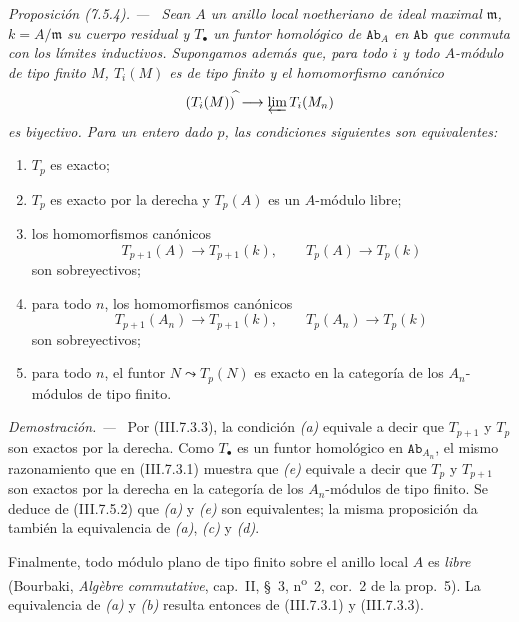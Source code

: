 \documentclass[10pt,oneside]{book}
\newcommand{\cat}[1]{\mathtt{#1}}
\newcommand{\sref}[2][]{\textup{(#2)}}
\newenvironment{proposition}[1][]{\par\medskip\noindent\itshape Proposición (#1). ---\ }{\par}
\newenvironment{proof}{\par\medskip\noindent\textit{Demostración. ---\ }}{\par}
\begin{document}
\begin{proposition}[7.5.4]
\label{III.7.5.4}
Sean $A$ un anillo local noetheriano de ideal maximal $\mathfrak m$,
$k=A/\mathfrak m$ su cuerpo residual y $T_\bullet$ un funtor
homológico de $\cat{Ab}_A$ en $\cat{Ab}$ que conmuta con los límites
inductivos. Supongamos además que, para todo $i$ y todo $A$-módulo
de tipo finito $M$, $T_i(M)$ es de tipo finito y el homomorfismo
canónico
\[
  (T_i(M))^{\widehat{\,}}
  \longrightarrow
  \varprojlim T_i(M_n)
\]
es biyectivo. Para un entero dado $p$, las condiciones siguientes
son equivalentes:
\begin{enumerate}
  \item[(a)] $T_p$ es exacto;
  \item[(b)] $T_p$ es exacto por la derecha y $T_p(A)$ es un
    $A$-módulo libre;
  \item[(c)] los homomorfismos canónicos
    \[
      T_{p+1}(A)\longrightarrow T_{p+1}(k),
      \qquad
      T_p(A)\longrightarrow T_p(k)
    \]
    son sobreyectivos;
  \item[(d)] para todo $n$, los homomorfismos canónicos
    \[
      T_{p+1}(A_n)\longrightarrow T_{p+1}(k),
      \qquad
      T_p(A_n)\longrightarrow T_p(k)
    \]
    son sobreyectivos;
  \item[(e)] para todo $n$, el funtor $N\leadsto T_p(N)$ es exacto
    en la categoría de los $A_n$-módulos de tipo finito.
\end{enumerate}
\end{proposition}

\begin{proof}
Por \sref{III.7.3.3}, la condición \emph{(a)} equivale a decir que
$T_{p+1}$ y $T_p$ son exactos por la derecha. Como $T_\bullet$ es
un funtor homológico en $\cat{Ab}_{A_n}$, el mismo razonamiento que
en \sref{III.7.3.1} muestra que \emph{(e)} equivale a decir que $T_p$ y
$T_{p+1}$ son exactos por la derecha en la categoría de los
$A_n$-módulos de tipo finito. Se deduce de \sref{III.7.5.2} que \emph{(a)}
y \emph{(e)} son equivalentes; la misma proposición da también la
equivalencia de \emph{(a)}, \emph{(c)} y \emph{(d)}.

Finalmente, todo módulo plano de tipo finito sobre el anillo local
$A$ es \emph{libre} (Bourbaki, \emph{Algèbre commutative}, cap.~II,
\S~3, n\textsuperscript{o}~2, cor.~2 de la prop.~5). La equivalencia
de \emph{(a)} y \emph{(b)} resulta entonces de \sref{III.7.3.1} y
\sref{III.7.3.3}.
\end{proof}
\end{document}
